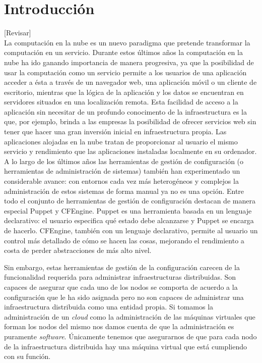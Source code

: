\chapter{Introducción}
\label{cap:introduccion}

[Revisar]\\

La computación en la nube es un nuevo paradigma que pretende transformar la computación en un servicio. Durante estos últimos años la computación en la nube ha ido ganando importancia de manera progresiva, ya que la posibilidad de usar la computación como un servicio permite a los usuarios de una aplicación acceder a ésta a través de un navegador web, una aplicación móvil o un cliente de escritorio, mientras que la lógica de la aplicación y los datos se encuentran en servidores situados en una localización remota. Esta facilidad de acceso a la aplicación sin necesitar de un profundo conocimento de la infraestructura es la que, por ejemplo, brinda a las empresas la posibilidad de ofrecer servicios web sin tener que hacer una gran inversión inicial en infraestructura propia. Las aplicaciones alojadas en la nube tratan de proporcionar al usuario el mismo servicio y rendimiento que las aplicaciones instaladas localmente en su ordenador.\\

A lo largo de los últimos años las herramientas de gestión de configuración (o herramientas de administración de sistemas) también han experimentado un considerable avance: con entornos cada vez más heterogéneos y complejos la administración de estos sistemas de forma manual ya no es una opción. Entre todo el conjunto de herramientas de gestión de configuración destacan de manera especial Puppet y CFEngine. Puppet es una herramienta basada en un lenguaje declarativo: el usuario especifica qué estado debe alcanzarse y Puppet se encarga de hacerlo. CFEngine, también con un lenguaje declarativo, permite al usuario un control más detallado de cómo se hacen las cosas, mejorando el rendimiento a costa de perder abstracciones de más alto nivel.

Sin embargo, estas herramientas de gestión de la configuración carecen de la funcionalidad requerida para administrar infraestructuras distribuidas. Son capaces de asegurar que cada uno de los nodos se comporta de acuerdo a la configuración que le ha sido asignada pero no son capaces de administrar una infraestructura distribuida como una entidad propia. Si tomamos la administración de un \emph{cloud} como la administración de las máquinas virtuales que forman los nodos del mismo nos damos cuenta de que la administración es puramente \emph{software}. Únicamente tenemos que asegurarnos de que para cada nodo de la infraestructura distribuida hay una máquina virtual que está cumpliendo con su función.\\

